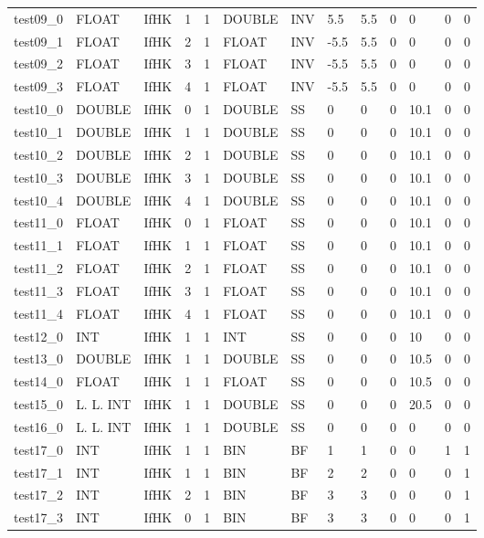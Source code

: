 \begin{longtable}{|l|l|l|p{0.5cm}|p{0.5cm}|l|p{0.5cm}|p{0.5cm}|p{0.5cm}|l|l|p{0.5cm}|l|}
test09\_0 & FLOAT & IfHK & 1 & 1 & DOUBLE & INV & 5.5 & 5.5 & 0 & 0 & 0 & 0 \\
test09\_1 & FLOAT & IfHK & 2 & 1 & FLOAT & INV & -5.5 & 5.5 & 0 & 0 & 0 & 0 \\
test09\_2 & FLOAT & IfHK & 3 & 1 & FLOAT & INV & -5.5 & 5.5 & 0 & 0 & 0 & 0 \\
test09\_3 & FLOAT & IfHK & 4 & 1 & FLOAT & INV & -5.5 & 5.5 & 0 & 0 & 0 & 0 \\
test10\_0 & DOUBLE & IfHK & 0 & 1 & DOUBLE & SS & 0 & 0 & 0 & 10.1 & 0 & 0 \\
test10\_1 & DOUBLE & IfHK & 1 & 1 & DOUBLE & SS & 0 & 0 & 0 & 10.1 & 0 & 0 \\
test10\_2 & DOUBLE & IfHK & 2 & 1 & DOUBLE & SS & 0 & 0 & 0 & 10.1 & 0 & 0 \\
test10\_3 & DOUBLE & IfHK & 3 & 1 & DOUBLE & SS & 0 & 0 & 0 & 10.1 & 0 & 0 \\
test10\_4 & DOUBLE & IfHK & 4 & 1 & DOUBLE & SS & 0 & 0 & 0 & 10.1 & 0 & 0 \\
test11\_0 & FLOAT & IfHK & 0 & 1 & FLOAT & SS & 0 & 0 & 0 & 10.1 & 0 & 0 \\
test11\_1 & FLOAT & IfHK & 1 & 1 & FLOAT & SS & 0 & 0 & 0 & 10.1 & 0 & 0 \\
test11\_2 & FLOAT & IfHK & 2 & 1 & FLOAT & SS & 0 & 0 & 0 & 10.1 & 0 & 0 \\
test11\_3 & FLOAT & IfHK & 3 & 1 & FLOAT & SS & 0 & 0 & 0 & 10.1 & 0 & 0 \\
test11\_4 & FLOAT & IfHK & 4 & 1 & FLOAT & SS & 0 & 0 & 0 & 10.1 & 0 & 0 \\
test12\_0 & INT & IfHK & 1 & 1 & INT & SS & 0 & 0 & 0 & 10 & 0 & 0 \\
test13\_0 & DOUBLE & IfHK & 1 & 1 & DOUBLE & SS & 0 & 0 & 0 & 10.5 & 0 & 0 \\
test14\_0 & FLOAT & IfHK & 1 & 1 & FLOAT & SS & 0 & 0 & 0 & 10.5 & 0 & 0 \\
test15\_0 & L. L. INT & IfHK & 1 & 1 & DOUBLE & SS & 0 & 0 & 0 & 20.5 & 0 & 0 \\
test16\_0 & L. L. INT & IfHK & 1 & 1 & DOUBLE & SS & 0 & 0 & 0 & 0 & 0 & 0 \\
test17\_0 & INT & IfHK & 1 & 1 & BIN & BF & 1 & 1 & 0 & 0 & 1 & 1 \\
test17\_1 & INT & IfHK & 1 & 1 & BIN & BF & 2 & 2 & 0 & 0 & 0 & 1 \\
test17\_2 & INT & IfHK & 2 & 1 & BIN & BF & 3 & 3 & 0 & 0 & 0 & 1 \\
test17\_3 & INT & IfHK & 0 & 1 & BIN & BF & 3 & 3 & 0 & 0 & 0 & 1 \\

\end{longtable}
